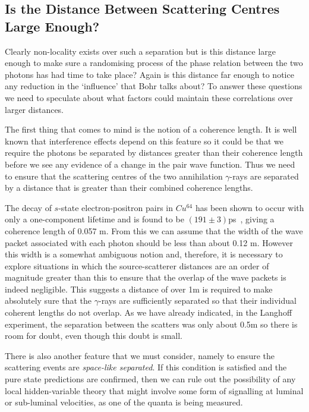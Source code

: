 \documentclass[12pt]{article}
\begin{document}
\subsection{Is the Distance Between Scattering Centres Large Enough?}

Clearly non-locality exists over such a separation but is this distance large enough  to make sure a randomising process of the phase relation between the two photons has had time to take place?  Again is this distance far enough to notice any reduction in the `influence' that Bohr talks about?   To answer these questions we need to speculate about what factors could maintain these correlations over larger distances.


The first thing that comes to mind is the notion of a coherence length.  It is well known that interference effects depend on this feature so it could be that we require the photons be separated by distances greater than their coherence length before we see any evidence of a change in the pair wave function.  Thus we need to ensure that the scattering centres of the two annihilation  $\gamma$-rays are separated by a distance  that is greater than their combined coherence lengths.

The decay of $s$-state electron-positron pairs in  $Cu^{64}$ has been shown to occur with only a one-component lifetime and is found to be $(191 \pm 3)$ps~\cite{phpj71},
giving a coherence length of 0.057 m. From this we can assume that the width of the wave packet associated with each photon should be less than about 0.12 m. However this width is a somewhat ambiguous notion and, therefore, it is necessary to explore situations in which the source-scatterer distances are an order of magnitude greater than this to ensure that the overlap of the wave packets is indeed negligible. This suggests a distance of over 1m is required to make absolutely sure that the $\gamma$-rays are sufficiently separated so that their individual coherent lengths do not overlap.  As we have already indicated, in the Langhoff experiment, the separation between the scatters was only about 0.5m so there is room for doubt, even though this doubt is small.

There is also another feature that we must consider, namely to ensure the  scattering events are {\em space-like separated}.  If this condition is satisfied and the pure state predictions are confirmed, then we can rule out the possibility of any local hidden-variable theory that might involve some form of signalling at luminal or sub-luminal velocities, as one of the quanta is being measured. 
\end{document}
